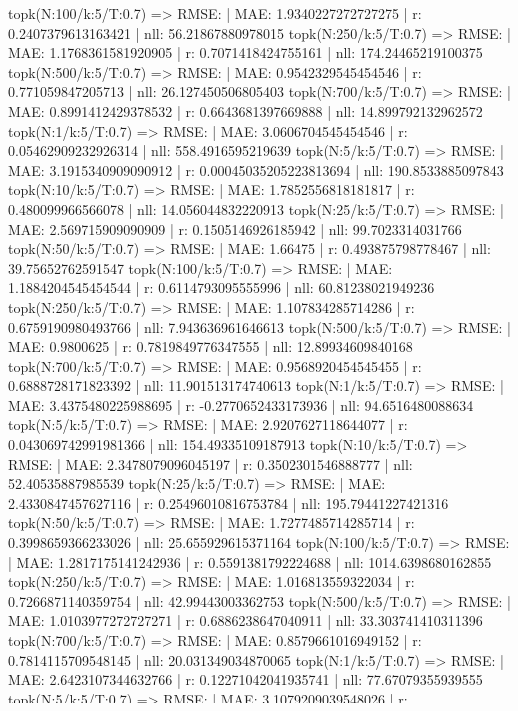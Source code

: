topk(N:100/k:5/T:0.7) => RMSE: | MAE: 1.9340227272727275 | r: 0.2407379613163421 | nll: 56.21867880978015
topk(N:250/k:5/T:0.7) => RMSE: | MAE: 1.1768361581920905 | r: 0.7071418424755161 | nll: 174.24465219100375
topk(N:500/k:5/T:0.7) => RMSE: | MAE: 0.9542329545454546 | r: 0.771059847205713 | nll: 26.127450506805403
topk(N:700/k:5/T:0.7) => RMSE: | MAE: 0.8991412429378532 | r: 0.6643681397669888 | nll: 14.899792132962572
topk(N:1/k:5/T:0.7) => RMSE: | MAE: 3.0606704545454546 | r: 0.05462909232926314 | nll: 558.4916595219639
topk(N:5/k:5/T:0.7) => RMSE: | MAE: 3.1915340909090912 | r: 0.00045035205223813694 | nll: 190.8533885097843
topk(N:10/k:5/T:0.7) => RMSE: | MAE: 1.7852556818181817 | r: 0.480099966566078 | nll: 14.056044832220913
topk(N:25/k:5/T:0.7) => RMSE: | MAE: 2.569715909090909 | r: 0.1505146926185942 | nll: 99.7023314031766
topk(N:50/k:5/T:0.7) => RMSE: | MAE: 1.66475 | r: 0.493875798778467 | nll: 39.75652762591547
topk(N:100/k:5/T:0.7) => RMSE: | MAE: 1.1884204545454544 | r: 0.6114793095555996 | nll: 60.81238021949236
topk(N:250/k:5/T:0.7) => RMSE: | MAE: 1.107834285714286 | r: 0.6759190980493766 | nll: 7.943636961646613
topk(N:500/k:5/T:0.7) => RMSE: | MAE: 0.9800625 | r: 0.7819849776347555 | nll: 12.89934609840168
topk(N:700/k:5/T:0.7) => RMSE: | MAE: 0.9568920454545455 | r: 0.6888728171823392 | nll: 11.901513174740613
topk(N:1/k:5/T:0.7) => RMSE: | MAE: 3.4375480225988695 | r: -0.2770652433173936 | nll: 94.6516480088634
topk(N:5/k:5/T:0.7) => RMSE: | MAE: 2.9207627118644077 | r: 0.043069742991981366 | nll: 154.49335109187913
topk(N:10/k:5/T:0.7) => RMSE: | MAE: 2.3478079096045197 | r: 0.3502301546888777 | nll: 52.40535887985539
topk(N:25/k:5/T:0.7) => RMSE: | MAE: 2.4330847457627116 | r: 0.25496010816753784 | nll: 195.79441227421316
topk(N:50/k:5/T:0.7) => RMSE: | MAE: 1.7277485714285714 | r: 0.3998659366233026 | nll: 25.655929615371164
topk(N:100/k:5/T:0.7) => RMSE: | MAE: 1.2817175141242936 | r: 0.5591381792224688 | nll: 1014.6398680162855
topk(N:250/k:5/T:0.7) => RMSE: | MAE: 1.016813559322034 | r: 0.7266871140359754 | nll: 42.99443003362753
topk(N:500/k:5/T:0.7) => RMSE: | MAE: 1.0103977272727271 | r: 0.6886238647040911 | nll: 33.303741410311396
topk(N:700/k:5/T:0.7) => RMSE: | MAE: 0.8579661016949152 | r: 0.7814115709548145 | nll: 20.031349034870065
topk(N:1/k:5/T:0.7) => RMSE: | MAE: 2.6423107344632766 | r: 0.12271042041935741 | nll: 77.67079355939555
topk(N:5/k:5/T:0.7) => RMSE: | MAE: 3.1079209039548026 | r: -0.042229831643954774 | nll: 225.4690844785241
topk(N:10/k:5/T:0.7) => RMSE: | MAE: 1.8715762711864408 | r: 0.3439793037428056 | nll: 73.25448253586481
